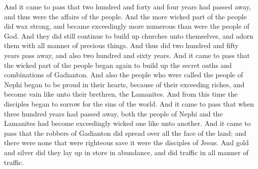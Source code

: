 And it came to pass that two hundred and forty and four years had passed away, and thus were the affairs of the people. And the more wicked part of the people did wax strong, and became exceedingly more numerous than were the people of God.
\bverse \iffalse And they did still continue to build up churches unto themselves, and adorn them with all manner of precious things.  And thus did two hundred and fifty years pass away, and also two hundred and sixty years. \fi
And they did still continue to build up churches unto themselves, and adorn them with all manner of precious things.  And thus did two hundred and fifty years pass away, and also two hundred and sixty years.
\bverse \iffalse And it came to pass that the wicked part of the people began again to build up the secret oaths and combinations of Gadianton. \fi
And it came to pass that the wicked part of the people began again to build up the secret oaths and combinations of Gadianton.
\bverse \iffalse And also the people who were called the people of Nephi began to be proud in their hearts, because of their exceeding riches, and become vain like unto their brethren, the Lamanites. \fi
And also the people who were called the people of Nephi began to be proud in their hearts, because of their exceeding riches, and become vain like unto their brethren, the Lamanites.
\bverse \iffalse And from this time the disciples began to sorrow for the sins of the world. \fi
And from this time the disciples began to sorrow for the sins of the world.
\bverse \iffalse And it came to pass that when three hundred years had passed away, both the people of Nephi and the Lamanites had become exceedingly wicked one like unto another. \fi
And it came to pass that when three hundred years had passed away, both the people of Nephi and the Lamanites had become exceedingly wicked one like unto another.
\bverse \iffalse And it came to pass that the robbers of Gadianton did spread over all the face of the land; and there were none that were righteous save it were the disciples of Jesus. And gold and silver did they lay up in store in abundance, and did traffic in all manner of traffic. \fi
And it came to pass that the robbers of Gadianton did spread over all the face of the land; and there were none that were righteous save it were the disciples of Jesus. And gold and silver did they lay up in store in abundance, and did traffic in all manner of traffic.
\bverse \iffalse And it came to pass that after three hundred and five years had passed away, (and the people did still remain in wickedness) Amos died; and his brother, Ammaron, did keep the record in his stead. \fi
